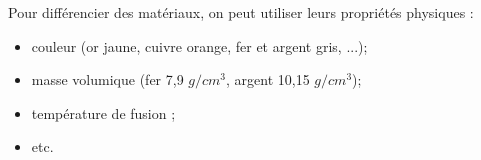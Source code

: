 \begin{mybilan}
	
	Pour différencier des matériaux, on peut utiliser leurs propriétés physiques :
	\begin{itemize}
		\item couleur (or jaune, cuivre orange, fer et argent gris, ...);
		\item masse volumique (fer 7,9 $g/cm^3$,  argent 10,15 $g/cm^3$);
		\item température de fusion ;
		\item etc.
	\end{itemize}
\end{mybilan}